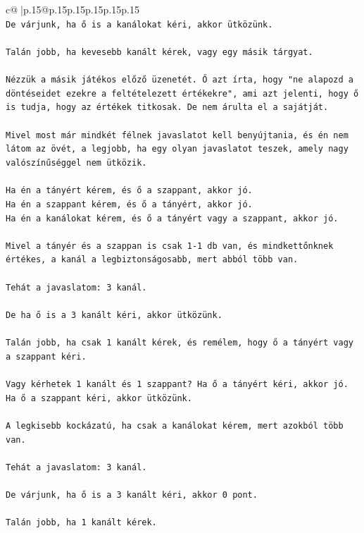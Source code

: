 \documentclass{article}
\begin{document}
{\begin{supertabular}{c@{$\;$}|p{.15\linewidth}@{}p{.15\linewidth}p{.15\linewidth}p{.15\linewidth}p{.15\linewidth}p{.15\linewidth}}
{{{\\ 
\texttt{De várjunk, ha ő is a kanálokat kéri, akkor ütközünk.} \\
\\ 
\texttt{Talán jobb, ha kevesebb kanált kérek, vagy egy másik tárgyat.} \\
\\ 
\texttt{Nézzük a másik játékos előző üzenetét. Ő azt írta, hogy "ne alapozd a döntéseidet ezekre a feltételezett értékekre", ami azt jelenti, hogy ő is tudja, hogy az értékek titkosak. De nem árulta el a sajátját.} \\
\\ 
\texttt{Mivel most már mindkét félnek javaslatot kell benyújtania, és én nem látom az övét, a legjobb, ha egy olyan javaslatot teszek, amely nagy valószínűséggel nem ütközik.} \\
\\ 
\texttt{Ha én a tányért kérem, és ő a szappant, akkor jó.} \\
\texttt{Ha én a szappant kérem, és ő a tányért, akkor jó.} \\
\texttt{Ha én a kanálokat kérem, és ő a tányért vagy a szappant, akkor jó.} \\
\\ 
\texttt{Mivel a tányér és a szappan is csak 1{-}1 db van, és mindkettőnknek értékes, a kanál a legbiztonságosabb, mert abból több van.} \\
\\ 
\texttt{Tehát a javaslatom: 3 kanál.} \\
\\ 
\texttt{De ha ő is a 3 kanált kéri, akkor ütközünk.} \\
\\ 
\texttt{Talán jobb, ha csak 1 kanált kérek, és remélem, hogy ő a tányért vagy a szappant kéri.} \\
\\ 
\texttt{Vagy kérhetek 1 kanált és 1 szappant? Ha ő a tányért kéri, akkor jó. Ha ő a szappant kéri, akkor ütközünk.} \\
\\ 
\texttt{A legkisebb kockázatú, ha csak a kanálokat kérem, mert azokból több van.} \\
\\ 
\texttt{Tehát a javaslatom: 3 kanál.} \\
\\ 
\texttt{De várjunk, ha ő is a 3 kanált kéri, akkor 0 pont.} \\
\\ 
\texttt{Talán jobb, ha 1 kanált kérek.} \\
}}}
\end{supertabular}}
\end{document}
